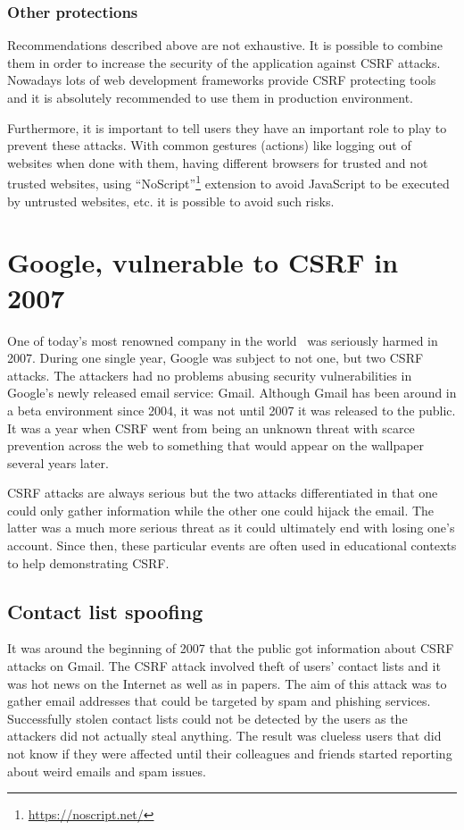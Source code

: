 \documentclass[a4paper,11pt,openany]{report}
\begin{document}
  \subsubsection{Other protections}  
  Recommendations described above are not exhaustive. It is possible to combine them in order to increase 
  the security of the application against CSRF attacks. Nowadays lots of web development frameworks provide 
  CSRF protecting tools and it is absolutely recommended to use them in production environment.
  
  Furthermore, it is important to tell users they have an important role to play to prevent these attacks. 
  With common gestures (actions) like logging out of websites when done with them, having different browsers 
  for trusted and not trusted websites, using ``NoScript''\footnote{\url{https://noscript.net/}} extension to 
  avoid JavaScript to be executed by untrusted websites, etc. it is possible to avoid such risks.
  
  \section{Google, vulnerable to CSRF in 2007}
  One of today's most renowned company in the world~\cite{forbes} was seriously harmed in 2007. During one single year, 
  Google was subject to not one, but two CSRF attacks. The attackers had no problems abusing security 
  vulnerabilities in Google's newly released email service: Gmail. Although Gmail has been around in a beta 
  environment since 2004, it was not until 2007 it was released to the public. It was a year when CSRF went from 
  being an unknown threat with scarce prevention across the web to something that would appear on the wallpaper 
  several years later.
  
  CSRF attacks are always serious but the two attacks differentiated in that one could only gather information 
  while the other one could hijack the email. The latter was a much more serious threat as it could ultimately end 
  with losing one's account. Since then, these particular events are often used in educational contexts to help 
  demonstrating CSRF\cite{owasp_csrf_presentation}. 

  
  \subsection{Contact list spoofing}
  It was around the beginning of 2007 that the public got information about CSRF attacks on Gmail. The CSRF 
  attack involved theft of users' contact lists and it was hot news on the Internet as well as in papers. The 
  aim of this attack was to gather email addresses that could be targeted by spam and phishing services.
  Successfully stolen contact lists could not be detected by the users as the attackers did not actually steal
  anything. The result was clueless users that did not know if they were affected until their colleagues and 
  friends started reporting about weird emails and spam issues\cite{gmail_hijack_csrf2}.
  
\end{document}
